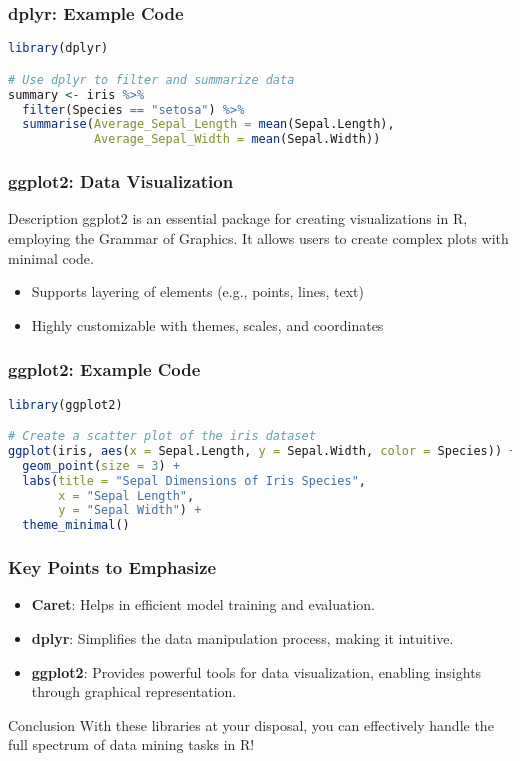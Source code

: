 \documentclass[aspectratio=169]{beamer}
\begin{document}
\begin{frame}[fragile]
    \frametitle{dplyr: Example Code}
    \begin{lstlisting}[language=R]
library(dplyr)

# Use dplyr to filter and summarize data
summary <- iris %>%
  filter(Species == "setosa") %>%
  summarise(Average_Sepal_Length = mean(Sepal.Length),
            Average_Sepal_Width = mean(Sepal.Width))
    \end{lstlisting}
\end{frame}

\begin{frame}[fragile]
    \frametitle{ggplot2: Data Visualization}
    \begin{block}{Description}
        ggplot2 is an essential package for creating visualizations in R, employing the Grammar of Graphics.
        It allows users to create complex plots with minimal code.
    \end{block}
    \begin{itemize}
        \item Supports layering of elements (e.g., points, lines, text)
        \item Highly customizable with themes, scales, and coordinates
    \end{itemize}
\end{frame}

\begin{frame}[fragile]
    \frametitle{ggplot2: Example Code}
    \begin{lstlisting}[language=R]
library(ggplot2)

# Create a scatter plot of the iris dataset
ggplot(iris, aes(x = Sepal.Length, y = Sepal.Width, color = Species)) +
  geom_point(size = 3) +
  labs(title = "Sepal Dimensions of Iris Species",
       x = "Sepal Length",
       y = "Sepal Width") +
  theme_minimal()
    \end{lstlisting}
\end{frame}

\begin{frame}[fragile]
    \frametitle{Key Points to Emphasize}
    \begin{itemize}
        \item \textbf{Caret}: Helps in efficient model training and evaluation.
        \item \textbf{dplyr}: Simplifies the data manipulation process, making it intuitive.
        \item \textbf{ggplot2}: Provides powerful tools for data visualization, enabling insights through graphical representation.
    \end{itemize}
    \begin{block}{Conclusion}
        With these libraries at your disposal, you can effectively handle the full spectrum of data mining tasks in R!
    \end{block}
\end{frame}
\end{document}
